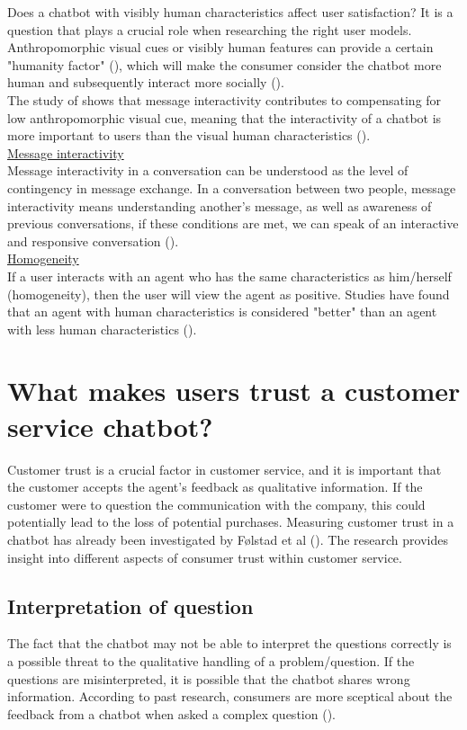 Does a chatbot with visibly human characteristics affect user satisfaction? It is a question that plays a crucial role when researching the right user models. Anthropomorphic visual cues or visibly human features can provide a certain "humanity factor" (\cite{Shyam2008}), which will make the consumer consider the chatbot more human and subsequently interact more socially (\cite{Go2019,Gong2007,Kim2012, Nowak2004}).\\
\break
The study of \cite{Go2019} shows that message interactivity contributes to compensating for low anthropomorphic visual cue, meaning that the interactivity of a chatbot is more important to users than the visual human characteristics (\cite{Go2019}).\\
\break
\ul{Message interactivity}\\
Message interactivity in a conversation can be understood as the level of contingency in message exchange. In a conversation between two people, message interactivity means understanding another's message, as well as awareness of previous conversations, if these conditions are met, we can speak of an interactive and responsive conversation (\cite{Go2019,Sudweeks1998}).\\
\break
\ul{Homogeneity}\\
If a user interacts with an agent who has the same characteristics as him/herself (homogeneity), then the user will view the agent as positive. Studies have found that an agent with human characteristics is considered "better" than an agent with less human characteristics (\cite{Go2019,Koda1996,Wexelblat1998}). 

\section{What makes users trust a customer service chatbot?}
Customer trust is a crucial factor in customer service, and it is important that the customer accepts the agent's feedback as qualitative information. If the customer were to question the communication with the company, this could potentially lead to the loss of potential purchases. Measuring customer trust in a chatbot has already been investigated by Følstad et al (\cite{Følstad2018}). The research provides insight into different aspects of consumer trust within customer service.\\

\subsection{Interpretation of question}
The fact that the chatbot may not be able to interpret the questions correctly is a possible threat to the qualitative handling of a problem/question. If the questions are misinterpreted, it is possible that the chatbot shares wrong information. According to past research, consumers are more sceptical about the feedback from a chatbot when asked a complex question (\cite{Følstad2018,Nordheim2019}).\\


